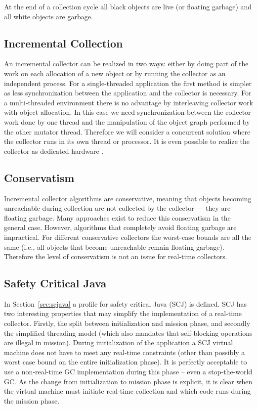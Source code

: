At the end of a collection cycle all black objects are live (or
floating garbage) and all white objects are garbage.

\subsection{Incremental Collection}

An incremental collector can be realized in two ways: either by
doing part of the work on each allocation of a new object or by
running the collector as an independent process. For a
single-threaded application the first method is simpler as less
synchronization between the application and the collector is
necessary. For a multi-threaded environment there is no advantage by
interleaving collector work with object allocation. In this case we
need synchronization between the collector work done by one thread
and the manipulation of the object graph performed by the other
mutator thread. Therefore we will consider a concurrent solution
where the collector runs in its own thread or processor. It is even
possible to realize the collector as dedicated hardware
\cite{gc:flavius}.

\subsection{Conservatism}

Incremental collector algorithms are conservative, meaning that
objects becoming unreachable during collection are not collected by
the collector --- they are floating garbage. Many approaches exist
to reduce this conservatism in the general case. However, algorithms
that completely avoid floating garbage are impractical. For
different conservative collectors the worst-case bounds are all the
same (i.e., all objects that become unreachable remain floating
garbage). Therefore the level of conservatism is not an issue for
real-time collectors.

\subsection{Safety Critical Java}

In Section~\ref{sec:scjava} a profile for safety critical Java (SCJ)
is defined. SCJ has two interesting properties that may simplify the
implementation of a real-time collector. Firstly, the split between
initialization and mission phase, and secondly the simplified
threading model (which also mandates that self-blocking operations
are illegal in mission).  During initialization of the application a
SCJ virtual machine does not have to meet any real-time constraints
(other than possibly a worst case bound on the entire initialization
phase). It is perfectly acceptable to use a non-real-time GC
implementation during this phase -- even a stop-the-world GC. As the
change from initialization to mission phase is explicit, it is clear
when the virtual machine must initiate real-time collection and
which code runs during the mission phase.


